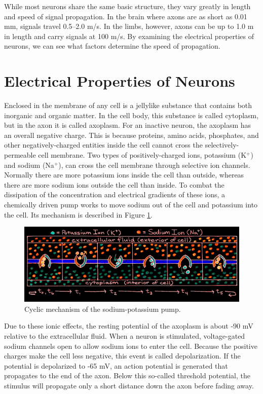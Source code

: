 While most neurons share the same basic structure, they vary greatly in length and speed of signal propagation.  In the brain where axons are as short as 0.01 mm, signals travel 0.5--2.0 m/s.  In the limbs, however, axons can be up to 1.0 m in length and carry signals at 100 m/s.  By examining the electrical properties of neurons, we can see what factors determine the speed of propagation.

\section{Electrical Properties of Neurons}

Enclosed in the membrane of any cell is a jellylike substance that contains both inorganic and organic matter.  In the cell body, this substance is called cytoplasm, but in the axon it is called axoplasm.  For an inactive neuron, the axoplasm has an overall negative charge.  This is because proteins, amino acids, phosphates, and other negatively-charged entities inside the cell cannot cross the selectively-permeable cell membrane.  Two types of positively-charged ions, potassium (K$^+$) and sodium (Na$^+$), can cross the cell membrane through selective ion channels.  Normally there are more potassium ions inside the cell than outside, whereas there are more sodium ions outside the cell than inside.  To combat the dissipation of the concentration and electrical gradients of these ions, a chemically driven pump works to move sodium out of the cell and potassium into the cell.  Its mechanism is described in Figure \ref{Fig11-4}.    
\begin{figure}[!htb]
	\centering
	\includegraphics[width=\textwidth]{./figures/Topic11/Fig11-4.png}
	\caption{Cyclic mechanism of the sodium-potassium pump.}
	\label{Fig11-4}
\end{figure}

Due to these ionic effects, the resting potential of the axoplasm is about -90 mV relative to the extracellular fluid.  When a neuron is stimulated, voltage-gated sodium channels open to allow sodium ions to enter the cell.  Because the positive charges make the cell less negative, this event is called depolarization.  If the potential is depolarized to -65 mV, an action potential is generated that propagates to the end of the axon.  Below this so-called threshold potential, the stimulus will propagate only a short distance down the axon before fading away.

